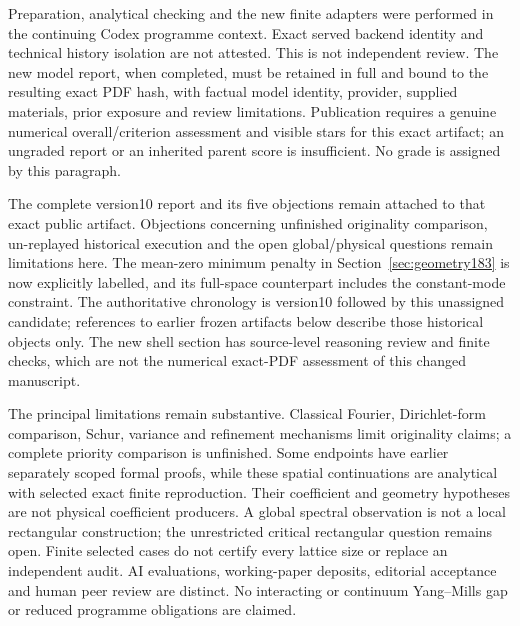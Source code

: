 \documentclass[11pt]{article}
\begin{document}
Preparation, analytical checking and the new finite adapters were performed
in the continuing Codex programme context. Exact served backend identity
and technical history isolation are not attested. This is not independent
review. The new model report, when completed, must be retained in full and
bound to the resulting exact PDF hash, with factual model identity,
provider, supplied materials, prior exposure and review limitations.
Publication requires a genuine numerical overall/criterion assessment and
visible stars for this exact artifact; an ungraded report or an inherited
parent score is insufficient. No grade is assigned by this paragraph.

The complete version10 report and its five objections remain attached to
that exact public artifact. Objections concerning unfinished originality
comparison, un-replayed historical execution and the open global/physical
questions remain limitations here. The mean-zero minimum penalty in
Section~\ref{sec:geometry183} is now explicitly labelled, and its full-space
counterpart includes the constant-mode constraint. The authoritative
chronology is version10 followed by this unassigned candidate; references
to earlier frozen artifacts below describe those historical objects only.
The new shell section has source-level reasoning review and finite checks,
which are not the numerical exact-PDF assessment of this changed manuscript.

The principal limitations remain substantive. Classical Fourier,
Dirichlet-form comparison, Schur, variance and refinement mechanisms limit
originality claims; a complete priority comparison is unfinished. Some
endpoints have earlier separately scoped formal proofs, while these spatial
continuations are analytical with selected exact finite reproduction.
Their coefficient and geometry hypotheses are not physical coefficient
producers. A global spectral observation is not a local rectangular
construction; the unrestricted critical rectangular question remains open.
Finite selected cases do not certify every lattice size or replace an
independent audit. AI evaluations, working-paper deposits, editorial
acceptance and human peer review are distinct. No interacting or continuum
Yang--Mills gap or reduced programme obligations are claimed.
\end{document}
